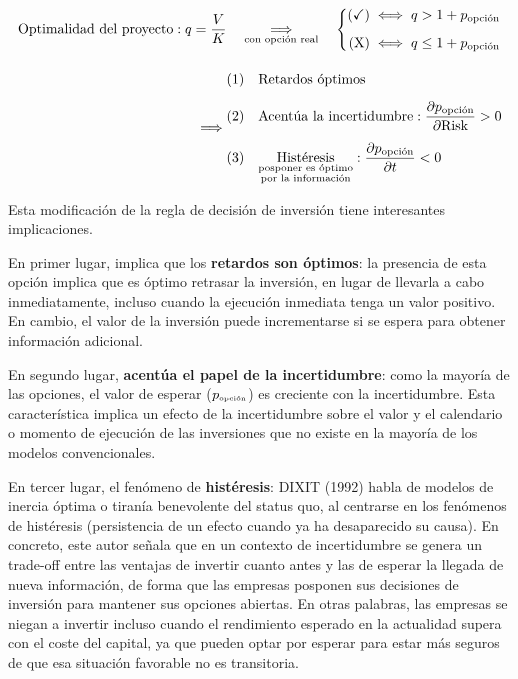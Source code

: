 \documentclass[10pt,a4paper]{article}
\begin{document}
$$\begin{aligned}
    \text{Optimalidad del proyecto}:q=\frac{V}{K}\quad \underset{\text{\scriptsize con opción real}}{\Longrightarrow}\quad
    \left\{\begin{aligned}
        (\checkmark)\iff q>1+p_{\text{\scriptsize opción}}\\[0.5em]
        (\mathrm X) \iff q\leq1+p_{\text{\scriptsize opción}}
    \end{aligned}\right.\\[1em]
    \Longrightarrow
    \begin{aligned}
        &(1)&&\text{Retardos óptimos}\\[0.5em]
        &(2)&&\text{Acentúa la incertidumbre}: \frac{\partial p_{\text{opción}}}{\partial \text{Risk}}>0\\[0.5em]
        &(3)&&\underset{\substack{\text{\scriptsize posponer es óptimo}\\\text{\scriptsize por la información}}}{\text{Histéresis}}:\frac{\partial p_{\text{opción}}}{\partial t}<0
    \end{aligned}
\end{aligned}$$

Esta modificación de la regla de decisión de inversión tiene interesantes implicaciones.

En primer lugar, implica que los \textbf{retardos son óptimos}: la presencia de esta opción implica que es óptimo retrasar la inversión, en lugar de llevarla a cabo inmediatamente, incluso cuando la ejecución inmediata tenga un valor positivo. En cambio, el valor de la inversión puede incrementarse si se espera para obtener información adicional.

En segundo lugar, \textbf{acentúa el papel de la incertidumbre}: como la mayoría de las opciones, el valor de esperar ($p_{\text{\tiny opción}}$) es creciente con la incertidumbre. Esta característica implica un efecto de la incertidumbre sobre el valor y el calendario o momento de ejecución de las inversiones que no existe en la mayoría de los modelos convencionales.

En tercer lugar, el fenómeno de \textbf{histéresis}: DIXIT (1992) habla de modelos de inercia óptima o tiranía benevolente del status quo, al centrarse en los fenómenos de histéresis (persistencia de un efecto cuando ya ha desaparecido su causa). En concreto, este autor señala que en un contexto de incertidumbre se genera un trade-off entre las ventajas de invertir cuanto antes y las de esperar la llegada de nueva información, de forma que las empresas posponen sus decisiones de inversión para mantener sus opciones abiertas. En otras palabras, las empresas se niegan a invertir incluso cuando el rendimiento esperado en la actualidad supera con el coste del capital, ya que pueden optar por esperar para estar más seguros de que esa situación favorable no es transitoria.
\end{document}
